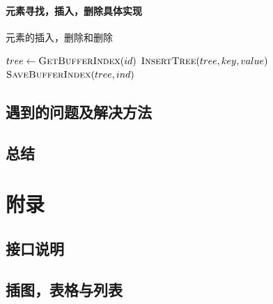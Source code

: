 \documentclass[UTF8]{ctexrep} %
\begin{document}
\subsection{元素寻找，插入，删除具体实现}

\begin{algorithm}
    \caption{元素的插入，删除和删除}
    \begin{algorithmic}
            \State $tree \leftarrow \Call{GetBufferIndex}{id}$
            \State $\Call{InsertTree}{tree, key, value}$
            \State $\Call{SaveBufferIndex}{tree, ind}$ 
        \EndFunction
    \end{algorithmic}
\end{algorithm}


\chapter{遇到的问题及解决方法}
\chapter{总结}

\newpage
\part{附录}


\begin{appendices}
\chapter{接口说明}

\chapter{插图，表格与列表}
\listoffigures
\listoftables
\listoflistings
\end{appendices}
\end{document}
